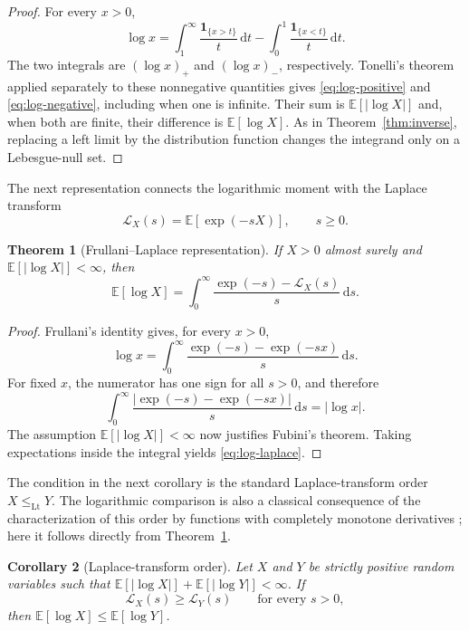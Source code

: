 \documentclass[11pt]{article}
\newtheorem{theorem}{Theorem}[section]
\newtheorem{corollary}[theorem]{Corollary}
\theoremstyle{definition}
\theoremstyle{remark}
\newcommand{\E}{\mathbb{E}}
\newcommand{\ind}{\mathbf{1}}
\newcommand{\dd}{\,\mathrm{d}}
\newcommand{\abs}[1]{\left\lvert #1\right\rvert}
\begin{document}
\begin{proof}
For every $x>0$,
\begin{equation}\label{eq:pointwise-log}
  \log x
  =\int_1^\infty\frac{\ind_{\{x>t\}}}{t}\dd t
   -\int_0^1\frac{\ind_{\{x<t\}}}{t}\dd t.
\end{equation}
The two integrals are $(\log x)_+$ and $(\log x)_-$, respectively.
Tonelli's theorem applied separately to these nonnegative quantities gives
\eqref{eq:log-positive} and \eqref{eq:log-negative}, including when one is
infinite.  Their sum is $\E[\abs{\log X}]$ and, when both are finite, their
difference is $\E[\log X]$.  As in Theorem~\ref{thm:inverse}, replacing a
left limit by the distribution function changes the integrand only on a
Lebesgue-null set.
\end{proof}

The next representation connects the logarithmic moment with the Laplace
transform
\[
  \mathcal L_X(s)=\E[\exp(-sX)],\qquad s\geq0.
\]

\begin{theorem}[Frullani--Laplace representation]\label{thm:log-laplace}
If $X>0$ almost surely and $\E[\abs{\log X}]<\infty$, then
\begin{equation}\label{eq:log-laplace}
  \E[\log X]
  =\int_0^\infty
    \frac{\exp(-s)-\mathcal L_X(s)}{s}\dd s.
\end{equation}
\end{theorem}

\begin{proof}
Frullani's identity \citep{Iyengar1941} gives, for every $x>0$,
\[
  \log x
  =\int_0^\infty\frac{\exp(-s)-\exp(-sx)}{s}\dd s.
\]
For fixed $x$, the numerator has one sign for all $s>0$, and therefore
\[
  \int_0^\infty
  \frac{\abs{\exp(-s)-\exp(-sx)}}{s}\dd s
  =\abs{\log x}.
\]
The assumption $\E[\abs{\log X}]<\infty$ now justifies Fubini's theorem.
Taking expectations inside the integral yields \eqref{eq:log-laplace}.
\end{proof}

The condition in the next corollary is the standard Laplace-transform order
$X\leq_{\mathrm{Lt}}Y$.  The logarithmic comparison is also a classical
consequence of the characterization of this order by functions with
completely monotone derivatives
\citep[Theorem~5.A.4]{ShakedShanthikumar2007}; here it follows directly from
Theorem~\ref{thm:log-laplace}.

\begin{corollary}[Laplace-transform order]\label{cor:laplace-order}
Let $X$ and $Y$ be strictly positive random variables such that
$\E[\abs{\log X}]+\E[\abs{\log Y}]<\infty$.  If
\[
  \mathcal L_X(s)\geq\mathcal L_Y(s)
  \qquad\text{for every }s>0,
\]
then $\E[\log X]\leq\E[\log Y]$.
\end{corollary}
\end{document}
